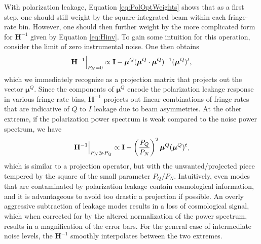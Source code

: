 \documentclass[twocolumn,apj,numberedappendix]{emulateapj}
\begin{document}
With polarization leakage, Equation \eqref{eq:PolOptWeights} shows that as a first step, one should still weight by
the square-integrated beam within each fringe-rate bin. However, one should then further weight by the more complicated
form for $\mathbf{H}^{-1}$ given by Equation \eqref{eq:Hinv}. To gain some intuition for
this operation, consider the limit of zero instrumental noise. One then obtains 
\begin{equation}
\mathbf{H}^{-1} \Big{|}_{P_N =0} \propto \mathbf{I} - \boldsymbol \mu^Q (\boldsymbol \mu^Q \cdot \boldsymbol
\mu^Q )^{-1} (\boldsymbol \mu^Q )^t,
\end{equation}
which we immediately recognize as a projection matrix that projects out the vector $\boldsymbol \mu^Q$. Since the
components of $\boldsymbol \mu^Q$ encode the polarization leakage response in various
fringe-rate bins, $\mathbf{H}^{-1}$ projects out linear combinations of
fringe rates that are indicative of $Q$ to $I$ leakage due to beam asymmetries. At the other
extreme, if the polarization power spectrum is weak compared to the noise power spectrum,
we have
\begin{equation}
\mathbf{H}^{-1} \Big{|}_{P_N \gg P_Q} \propto \mathbf{I} - \left(\frac{P_Q}{P_N} \right)^2 \boldsymbol \mu^Q  (\boldsymbol \mu^Q )^t,
\end{equation}
which is similar to a projection operator, but with the unwanted/projected piece tempered
by the square of the small parameter $P_Q / P_N$. Intuitively, even modes that are
contaminated by polarization leakage contain cosmological information, and it is advantageous
to avoid too drastic a projection if possible. An overly aggressive subtraction of leakage
modes results in a loss of cosmological signal, which when corrected for by the altered
normalization of the power spectrum, results in a magnification of the error bars. For the
general case of intermediate noise levels, the $\mathbf{H}^{-1}$ smoothly interpolates
between the two extremes.
\end{document}

